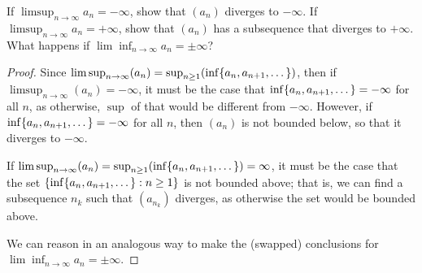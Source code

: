 \begin{exercise}{25}
If $\limsup_{n\to\infty}a_n=-\infty$, show that $(a_n)$ diverges to $-\infty$. If $\limsup_{n\to\infty}a_n=+\infty$, show that $(a_n)$ has a subsequence that diverges to $+\infty$. What happens if $\lim\inf_{n\to\infty}a_n=\pm\infty$?
\end{exercise}
\begin{proof}
Since $\limsup_{n\to\infty}(a_n) = \sup_{n\geq 1}(\inf\{a_n,a_{n+1},\dots\})$, then if\\ $\limsup_{n\to\infty}(a_n)=-\infty$, it must be the case that $\inf\{a_n,a_{n+1},\dots\}=-\infty$ for all $n$, as otherwise, $\sup$ of that would be different from $-\infty$. However, if $\inf\{a_n,a_{n+1},\dots\}=-\infty$ for all $n$, then $(a_n)$ is not bounded below, so that it diverges to $-\infty$.

If $\limsup_{n\to\infty}(a_n)= \sup_{n\geq 1}(\inf\{a_n,a_{n+1},\dots\})= \infty$, it must be the case that the set $\{\inf\{a_n,a_{n+1},\dots\}:n\geq 1\}$ is not bounded above; that is, we can find a subsequence $n_k$ such that $(a_{n_k})$ diverges, as otherwise the set would be bounded above. 

We can reason in an analogous way to make the (swapped) conclusions for $\lim\inf_{n\to\infty}a_n=\pm\infty$.
\end{proof}

